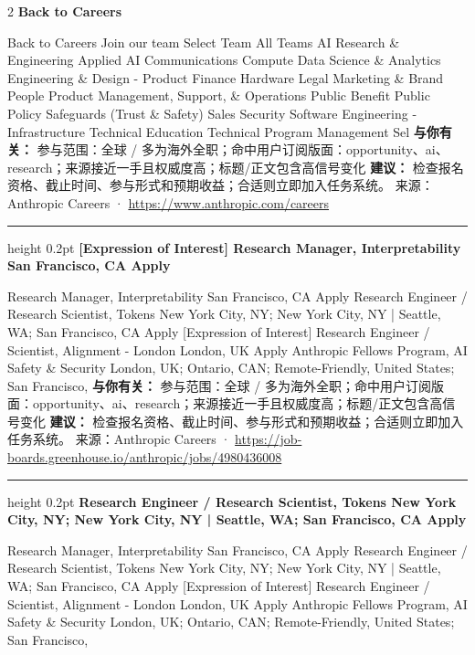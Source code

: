 \documentclass[10.5pt]{ctexart}
\begin{document}
\begin{multicols}{2}
{\large\bfseries Back to Careers}\par
Back to Careers Join our team Select Team All Teams AI Research \& Engineering Applied AI Communications Compute Data Science \& Analytics Engineering \& Design - Product Finance Hardware Legal Marketing \& Brand People Product Management, Support, \& Operations Public Benefit Public Policy Safeguards (Trust \& Safety) Sales Security Software Engineering - Infrastructure Technical Education Technical Program Management Sel
\textbf{与你有关：} 参与范围：全球 / 多为海外全职；命中用户订阅版面：opportunity、ai、research；来源接近一手且权威度高；标题/正文包含高信号变化
\textbf{建议：} 检查报名资格、截止时间、参与形式和预期收益；合适则立即加入任务系统。
{\footnotesize\color{ormuted} 来源：Anthropic Careers · \url{https://www.anthropic.com/careers}}
\vspace{2mm}
\hrule height 0.2pt
\vspace{2mm}
{\large\bfseries [Expression of Interest] Research Manager, Interpretability San Francisco, CA Apply}\par
[Expression of Interest] Research Manager, Interpretability San Francisco, CA Apply Research Engineer / Research Scientist, Tokens New York City, NY; New York City, NY | Seattle, WA; San Francisco, CA Apply [Expression of Interest] Research Engineer / Scientist, Alignment - London London, UK Apply Anthropic Fellows Program, AI Safety \& Security London, UK; Ontario, CAN; Remote-Friendly, United States; San Francisco, 
\textbf{与你有关：} 参与范围：全球 / 多为海外全职；命中用户订阅版面：opportunity、ai、research；来源接近一手且权威度高；标题/正文包含高信号变化
\textbf{建议：} 检查报名资格、截止时间、参与形式和预期收益；合适则立即加入任务系统。
{\footnotesize\color{ormuted} 来源：Anthropic Careers · \url{https://job-boards.greenhouse.io/anthropic/jobs/4980436008}}
\vspace{2mm}
\hrule height 0.2pt
\vspace{2mm}
{\large\bfseries Research Engineer / Research Scientist, Tokens New York City, NY; New York City, NY | Seattle, WA; San Francisco, CA Apply}\par
[Expression of Interest] Research Manager, Interpretability San Francisco, CA Apply Research Engineer / Research Scientist, Tokens New York City, NY; New York City, NY | Seattle, WA; San Francisco, CA Apply [Expression of Interest] Research Engineer / Scientist, Alignment - London London, UK Apply Anthropic Fellows Program, AI Safety \& Security London, UK; Ontario, CAN; Remote-Friendly, United States; San Francisco, 

\end{multicols}
\end{document}
